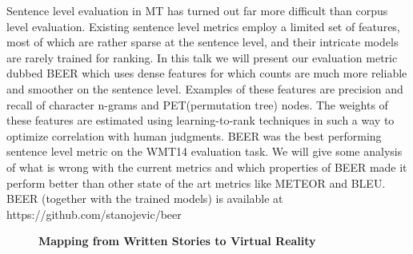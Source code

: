 \documentclass[10pt, a4paper, twopage, headinclude, footinclude, BCOR5mm]{book}
\begin{document}
\begin{table}[t!]
\end{table} 
\noindent
Sentence level evaluation in MT has turned out far more difficult than corpus level evaluation. Existing sentence level metrics employ a limited set of features, most of which are rather sparse at the sentence level, and their intricate models are rarely trained for ranking. In this talk we will present our evaluation metric dubbed BEER which uses dense features for which counts are much more reliable and smoother on the sentence level. Examples of these features are precision and recall of character n-grams and PET(permutation tree) nodes. The weights of these features are estimated using learning-to-rank techniques in such a way to optimize correlation with human judgments. BEER was the best performing sentence level metric on the WMT14 evaluation task. We will give some analysis of what is wrong with the current metrics and which properties of BEER made it perform better than other state of the art metrics like METEOR and BLEU. BEER (together with the trained models) is available at https://github.com/stanojevic/beer  

\newpage

\begin{figure}[t!]
\centering
\large\textbf{Mapping from Written Stories to Virtual Reality}
\vspace*{0.5cm}
\end{figure}
\end{document}
